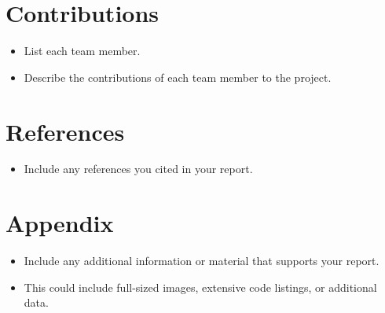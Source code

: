 \documentclass{article}
\begin{document}
\section{Contributions}
\label{sec:contributions}
\begin{itemize}
    \item List each team member.
    \item Describe the contributions of each team member to the project.
\end{itemize}

\section{References}
\label{sec:references}
\begin{itemize}
    \item Include any references you cited in your report.
\end{itemize}

\section{Appendix}
\label{sec:appendix}
\begin{itemize}
    \item Include any additional information or material that supports your report.
    \item This could include full-sized images, extensive code listings, or
          additional data.
\end{itemize}
\end{document}
